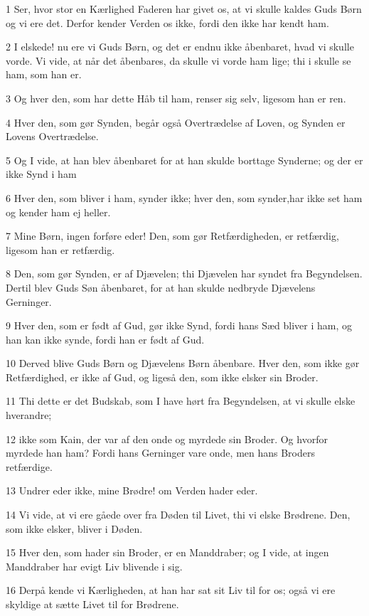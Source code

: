 \par 1 Ser, hvor stor en Kærlighed Faderen har givet os, at vi skulle kaldes Guds Børn og vi ere det. Derfor kender Verden os ikke, fordi den ikke har kendt ham.
\par 2 I elskede! nu ere vi Guds Børn, og det er endnu ikke åbenbaret, hvad vi skulle vorde. Vi vide, at når det åbenbares, da skulle vi vorde ham lige; thi i skulle se ham, som han er.
\par 3 Og hver den, som har dette Håb til ham, renser sig selv, ligesom han er ren.
\par 4 Hver den, som gør Synden, begår også Overtrædelse af Loven, og Synden er Lovens Overtrædelse.
\par 5 Og I vide, at han blev åbenbaret for at han skulde borttage Synderne; og der er ikke Synd i ham
\par 6 Hver den, som bliver i ham, synder ikke; hver den, som synder,har ikke set ham og kender ham ej heller.
\par 7 Mine Børn, ingen forføre eder! Den, som gør Retfærdigheden, er retfærdig, ligesom han er retfærdig.
\par 8 Den, som gør Synden, er af Djævelen; thi Djævelen har syndet fra Begyndelsen. Dertil blev Guds Søn åbenbaret, for at han skulde nedbryde Djævelens Gerninger.
\par 9 Hver den, som er født af Gud, gør ikke Synd, fordi hans Sæd bliver i ham, og han kan ikke synde, fordi han er født af Gud.
\par 10 Derved blive Guds Børn og Djævelens Børn åbenbare. Hver den, som ikke gør Retfærdighed, er ikke af Gud, og ligeså den, som ikke elsker sin Broder.
\par 11 Thi dette er det Budskab, som I have hørt fra Begyndelsen, at vi skulle elske hverandre;
\par 12 ikke som Kain, der var af den onde og myrdede sin Broder. Og hvorfor myrdede han ham? Fordi hans Gerninger vare onde, men hans Broders retfærdige.
\par 13 Undrer eder ikke, mine Brødre! om Verden hader eder.
\par 14 Vi vide, at vi ere gåede over fra Døden til Livet, thi vi elske Brødrene. Den, som ikke elsker, bliver i Døden.
\par 15 Hver den, som hader sin Broder, er en Manddraber; og I vide, at ingen Manddraber har evigt Liv blivende i sig.
\par 16 Derpå kende vi Kærligheden, at han har sat sit Liv til for os; også vi ere skyldige at sætte Livet til for Brødrene.
